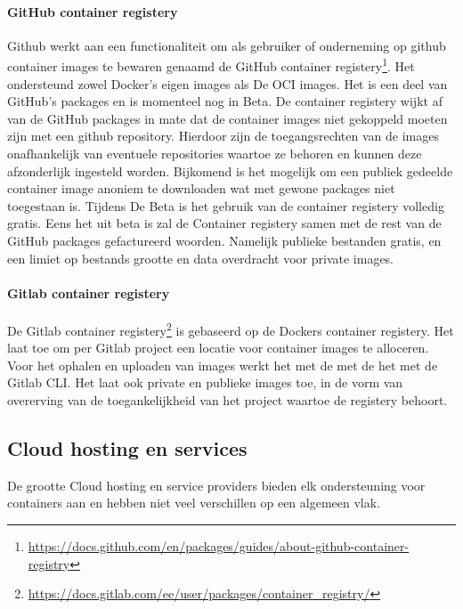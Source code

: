 \paragraph{GitHub container registery}
Github werkt aan een functionaliteit om als gebruiker of onderneming op github container images te bewaren genaamd de  GitHub container registery\footnote{\url{https://docs.github.com/en/packages/guides/about-github-container-registry}}. Het ondersteund zowel Docker’s eigen images als De OCI images. Het is een deel van GitHub’s packages en is momenteel nog in Beta. De container registery wijkt af van de GitHub packages in mate dat de container images niet gekoppeld moeten zijn met een github repository. Hierdoor zijn de toegangsrechten van de images onafhankelijk van eventuele repositories waartoe ze behoren en kunnen deze afzonderlijk ingesteld worden. Bijkomend is het mogelijk om een publiek gedeelde container image anoniem te downloaden wat met gewone packages niet toegestaan is. Tijdens De Beta is het gebruik van de container registery volledig gratis. Eens het uit beta is zal de Container registery samen met de rest van de GitHub packages gefactureerd woorden. Namelijk publieke bestanden gratis, en een limiet op bestands grootte en data overdracht voor private images.
\paragraph{Gitlab container registery}
De Gitlab container registery\footnote{\url{https://docs.gitlab.com/ee/user/packages/container_registry/}} is gebaseerd op de Dockers container registery. Het laat toe om per Gitlab project een locatie voor container images te alloceren. Voor het ophalen en uploaden van images werkt het met de met de het met de Gitlab CLI. Het laat ook private en publieke images toe, in de vorm van overerving van de toegankelijkheid van het project waartoe de registery behoort. 


\subsection{Cloud hosting en services}
De grootte Cloud hosting en service providers bieden elk ondersteuning voor containers aan en hebben niet veel verschillen op een algemeen vlak.
